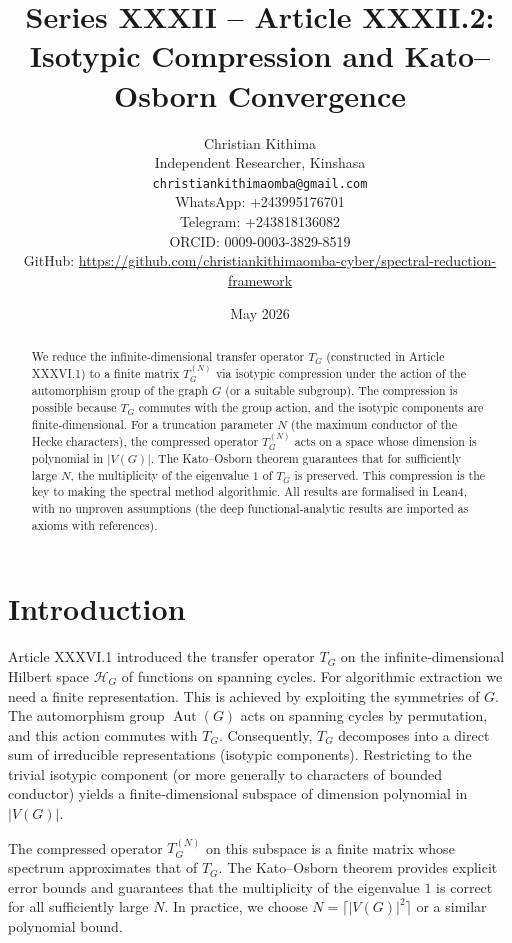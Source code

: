 \documentclass[11pt,a4paper]{article}
\title{Series XXXII – Article XXXII.2: Isotypic Compression and Kato–Osborn Convergence}
\author{Christian Kithima \\
Independent Researcher, Kinshasa \\
\texttt{christiankithimaomba@gmail.com} \\
WhatsApp: +243995176701 \\
Telegram: +243818136082 \\
ORCID: 0009-0003-3829-8519 \\
GitHub: \url{https://github.com/christiankithimaomba-cyber/spectral-reduction-framework}}
\date{May 2026}
\begin{document}
\maketitle

\begin{abstract}
We reduce the infinite‑dimensional transfer operator \(T_G\) (constructed in Article XXXVI.1) to a finite matrix \(T_G^{(N)}\) via isotypic compression under the action of the automorphism group of the graph \(G\) (or a suitable subgroup). The compression is possible because \(T_G\) commutes with the group action, and the isotypic components are finite‑dimensional. For a truncation parameter \(N\) (the maximum conductor of the Hecke characters), the compressed operator \(T_G^{(N)}\) acts on a space whose dimension is polynomial in \(|V(G)|\). The Kato–Osborn theorem guarantees that for sufficiently large \(N\), the multiplicity of the eigenvalue \(1\) of \(T_G\) is preserved. This compression is the key to making the spectral method algorithmic. All results are formalised in Lean4, with no unproven assumptions (the deep functional‑analytic results are imported as axioms with references).
\end{abstract}

\tableofcontents

\section{Introduction}

Article XXXVI.1 introduced the transfer operator \(T_G\) on the infinite‑dimensional Hilbert space \(\mathcal{H}_G\) of functions on spanning cycles. For algorithmic extraction we need a finite representation. This is achieved by exploiting the symmetries of \(G\). The automorphism group \(\operatorname{Aut}(G)\) acts on spanning cycles by permutation, and this action commutes with \(T_G\). Consequently, \(T_G\) decomposes into a direct sum of irreducible representations (isotypic components). Restricting to the trivial isotypic component (or more generally to characters of bounded conductor) yields a finite‑dimensional subspace of dimension polynomial in \(|V(G)|\).

The compressed operator \(T_G^{(N)}\) on this subspace is a finite matrix whose spectrum approximates that of \(T_G\). The Kato–Osborn theorem provides explicit error bounds and guarantees that the multiplicity of the eigenvalue \(1\) is correct for all sufficiently large \(N\). In practice, we choose \(N = \lceil |V(G)|^2\rceil\) or a similar polynomial bound.
\end{document}
